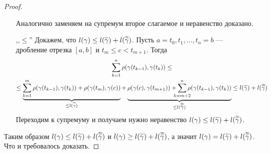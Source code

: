 \begin{proof}
\begin{enumerate}
\begin{notice}
\begin{equation*}
        \end{equation*}
        Аналогично заменяем на супремум второе слагаемое и неравенство доказано.
      \end{notice}
      \item[,,$\leq$''] Докажем, что $l(\gamma) \leq l(\widetilde{\gamma}) + l(\vardbtilde{\gamma})$. Пусть $a = t_0, t_1, \dotsc, t_n = b$ --- дробление отрезка $[a, b]$ и $t_m \leq c < t_{m + 1}$. Тогда
      \begin{equation*}
        \begin{gathered}
          \sum\limits_{k = 1}^{n} \rho(\gamma(t_{k - 1}), \gamma(t_k))
          \leq \\ \leq
          \underbrace{\sum\limits_{k = 1}^{m} \rho(\gamma(t_{k - 1}), \gamma(t_k)) + \rho(\gamma(t_m), \gamma(c))}_{\mathclap{\leq l(\widetilde{\gamma})}} +
          \underbrace{\rho(\gamma(c), \gamma(t_{m + 1})) + \sum\limits_{\mathclap{k = m + 2}}^{n} \rho(\gamma(t_{k - 1}), \gamma(t_k))}_{\mathclap{\leq l(\vardbtilde{\gamma})}} \leq l(\widetilde{\gamma}) + l(\vardbtilde{\gamma})
        \end{gathered}
      \end{equation*}
      Переходим к супремуму и получаем нужно неравенство $l(\gamma) \leq l(\widetilde{\gamma}) + l(\vardbtilde{\gamma})$.
      \end{enumerate}
      Таким образом $l(\gamma) \leq l(\widetilde{\gamma}) + l(\vardbtilde{\gamma})$ и $l(\gamma) \geq l(\widetilde{\gamma}) + l(\vardbtilde{\gamma})$, а значит $l(\gamma) = l(\widetilde{\gamma}) + l(\vardbtilde{\gamma})$. Что и требовалось доказать.
  \end{proof}
  